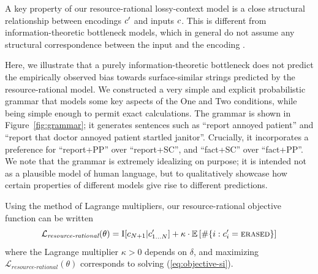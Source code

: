 
A key property of our resource-rational lossy-context model is a close structural relationship between encodings $c'$ and inputs $c$.
This is different from information-theoretic bottleneck models, which in general do not assume any structural correspondence between the input and the encoding \citep{tishby2000information}.

Here, we illustrate that a purely information-theoretic bottleneck does not predict the empirically observed bias towards surface-similar strings predicted by the resource-rational model.
We constructed a very simple and explicit probabilistic grammar that models some key aspects of the One and Two conditions, while being simple enough to permit exact calculations.
The grammar is shown in Figure~\ref{fig:grammar}; it generates sentences such as ``report annoyed patient'' and ``report that doctor annoyed patient startled janitor''.
Crucially, it incorporates a preference for ``report+PP'' over ``report+SC'', and ``fact+SC'' over ``fact+PP''.
We note that the grammar is extremely idealizing on purpose; it is intended not as a plausible model of human language, but to qualitatively showcase how certain properties of different models give rise to different predictions.


Using the method of Lagrange multipliers, our resource-rational objective function can be written 
\begin{equation}\label{eq:resource-toy}
\mathcal{L}_\textit{resource-rational}(\theta) = \operatorname{I}[c_{N+1}|c'_{1\dots N}] + \kappa \cdot \mathbb{E}\left[\#\{i : c'_i=\text{\textsc{erased}}\}\right]
\end{equation}
where the Lagrange multiplier $\kappa > 0$ depends on $\delta$, and maximizing $\mathcal{L}_\textit{resource-rational}(\theta)$ corresponds to solving (\ref{eq:objective-si}).

